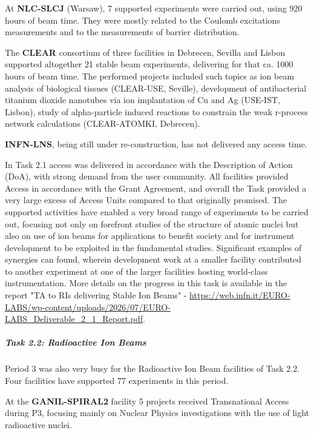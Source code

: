 At \textbf{NLC-SLCJ} (Warsaw), 7 supported experiments were carried out, using 920 hours of beam time. They were mostly related to the Coulomb excitations measurements and to the measurements of barrier distribution.

The \textbf{CLEAR} consortium of three facilities in Debrecen, Sevilla and Lisbon supported altogether 21 stable beam experiments, delivering for that ca. 1000 hours of beam time. The performed projects included such topics as ion beam analysis of biological tissues (CLEAR-USE, Seville), development of antibacterial titanium dioxide nanotubes via ion implantation of Cu and Ag (USE-IST, Lisbon), study of alpha-particle induced reactions to constrain the weak r-process network calculations (CLEAR-ATOMKI, Debrecen). 

\textbf{INFN-LNS}, being still under re-construction, has not delivered any access time.

In Task 2.1 access was delivered in accordance with the Description of Action (DoA), with strong demand from the user community. All facilities provided Access in accordance with the Grant Agreement, and overall the Task provided a very large excess of Access Units compared to that originally promised. The supported activities have enabled a very broad range of experiments to be carried out, focusing not only on forefront studies of the structure of atomic nuclei but also on use of ion beams for applications to benefit society and for instrument development to be exploited in the fundamental studies. Significant examples of synergies can found, wherein development work at a smaller facility contributed to another experiment at one of the larger facilities hosting world-class instrumentation. More details on the progress in this task is available in the report "TA to RIs delivering Stable Ion Beams" - \url{https://web.infn.it/EURO-LABS/wp-content/uploads/2026/07/EURO-LABS_Deliverable_2_1_Report.pdf}.

\subparagraph{Task 2.2: Radioactive Ion Beams} \mbox{}


Period 3 was also very busy for the Radioactive Ion Beam facilities of Task 2.2. Four facilities have supported 77 experiments in this period. 



At the \textbf{GANIL-SPIRAL2} facility 5 projects received Transnational Access during P3, focusing mainly  on Nuclear Physics investigations with the use of light radioactive nuclei.



